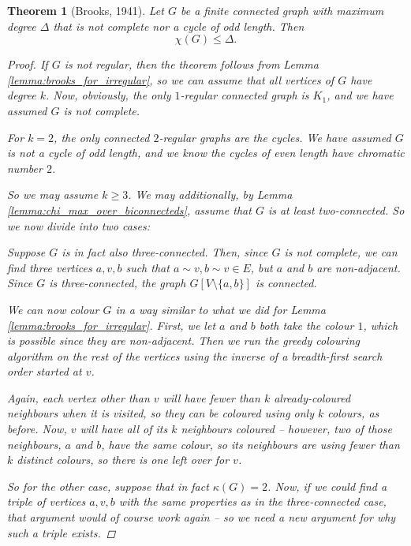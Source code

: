 \documentclass[nobib]{tufte-handout}
\newtheorem{theorem}{Theorem}
\begin{document}
\begin{theorem}[Brooks, 1941]
  Let $G$ be a finite connected graph with maximum degree $\Delta$ that is not complete nor a cycle of odd length. Then
  $$\chi(G) \leq \Delta.$$

  \begin{proof}
    If $G$ is not regular, then the theorem follows from Lemma \ref{lemma:brooks_for_irregular}, so we can assume that all vertices of $G$ have degree $k$. Now, obviously, the only $1$-regular connected graph is $K_1$, and we have assumed $G$ is not complete.

    For $k=2$, the only connected $2$-regular graphs are the cycles. We have assumed $G$ is not a cycle of odd length, and we know the cycles of even length have chromatic number $2$.

    So we may assume $k \geq 3$. We may additionally, by Lemma \ref{lemma:chi_max_over_biconnecteds}, assume that $G$ is at least two-connected. So we now divide into two cases:

    Suppose $G$ is in fact also three-connected. Then, since $G$ is not complete, we can find three vertices $a, v, b$ such that $a \sim v, b \sim v \in E$, but $a$ and $b$ are non-adjacent. Since $G$ is three-connected, the graph $G[V\setminus \{a,b\}]$ is connected.

    We can now colour $G$ in a way similar to what we did for Lemma \ref{lemma:brooks_for_irregular}. First, we let $a$ and $b$ both take the colour $1$, which is possible since they are non-adjacent. Then we run the greedy colouring algorithm on the rest of the vertices using the inverse of a breadth-first search order started at $v$.

    Again, each vertex other than $v$ will have fewer than $k$ already-coloured neighbours when it is visited, so they can be coloured using only $k$ colours, as before. Now, $v$ will have all of its $k$ neighbours coloured -- however, two of those neighbours, $a$ and $b$, have the same colour, so its neighbours are using fewer than $k$ \emph{distinct} colours, so there is one left over for $v$.

    So for the other case, suppose that in fact $\kappa(G) = 2$. Now, if we could find a triple of vertices $a, v, b$ with the same properties as in the three-connected case, that argument would of course work again -- so we need a new argument for why such a triple exists.


\end{proof}
\end{theorem}
\end{document}
